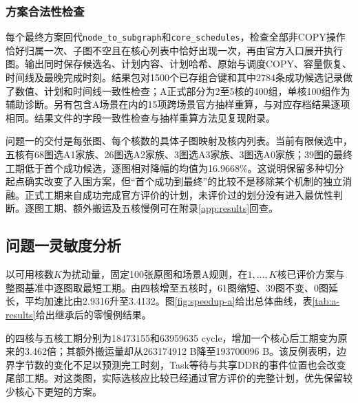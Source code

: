 \subsubsection{方案合法性检查}
每个最终方案回代\texttt{node\_to\_subgraph}和\texttt{core\_schedules}，检查全部非COPY操作恰好归属一次、子图不空且在核心列表中恰好出现一次，再由官方入口展开执行图。输出同时保存候选名、计划内容、计划哈希、原始与调度COPY、容量恢复、时间线及最晚完成时刻。结果包对1500个已存组合键和其中2784条成功候选记录做了数值、计划和时间线一致性检查；A正式部分为2至5核的400组，单核100组作为辅助诊断。另有包含A场景在内的15项跨场景官方抽样重算，与对应存档结果逐项相同。结果文件的字段一致性检查与抽样重算方法见复现附录。

问题一的交付是每张图、每个核数的具体子图映射及核内列表。当前有限候选中，五核有68图选A1家族、26图选A2家族、3图选A3家族、3图选A0家族；39图的最终工期低于首个成功候选，逐图相对降幅的均值为16.9668\%。这说明保留多种切分起点确实改变了入围方案，但“首个成功到最终”的比较不是移除某个机制的独立消融。正式工期来自成功完成官方评价的计划，未评价过的划分没有进入最优性判断。逐图工期、额外搬运及五核慢例可在附录\ref{app:results}回查。

\subsection{问题一灵敏度分析}
以可用核数$K$为扰动量，固定100张原图和场景A规则，在$1,\ldots,K$核已评价方案与整图基准中逐图取最短工期。由四核增至五核时，61图缩短、39图不变、0图延长，平均加速比由2.9316升至3.4132。图\ref{fig:speedup-a}给出总体曲线，表\ref{tab:a-results}给出继承后的零慢例结果。

的四核与五核工期分别为18473155和63959635 cycle，增加一个核心后工期变为原来的3.462倍；其额外搬运量却从263174912 B降至193700096 B。该反例表明，边界字节数的变化不足以预测完工时刻，Task等待与共享DDR的事件位置也会改变尾部工期。对这类图，实际选核应比较已经通过官方评价的完整计划，优先保留较少核心下更短的方案。
